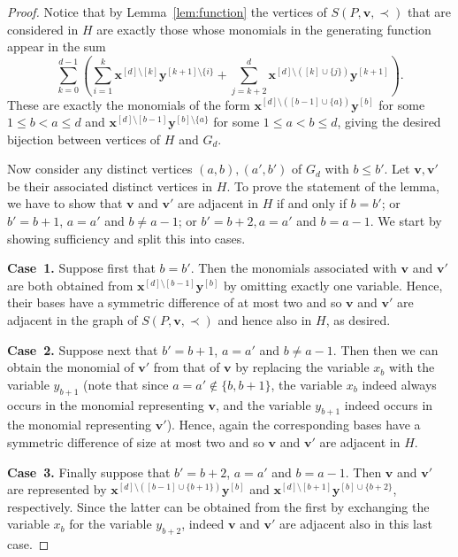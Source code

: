 \documentclass[centering,11pt,reqno]{amsart}
\theoremstyle{definition}
\begin{document}
\begin{proof}
Notice that by Lemma~\ref{lem:function} the vertices of $S(P,\mathbf{v},\prec)$ that are considered in $H$ are exactly those whose monomials in the generating function appear in the sum
\[\sum_{k=0}^{d-1} \left(\sum_{i=1}^{k} \mathbf{x}^{[d] \setminus [k]} \mathbf{y}^{[k+1] \setminus \{i\}} + \sum_{j=k+2}^{d} \mathbf{x}^{[d] \setminus ([k] \cup \{j\})} \mathbf{y}^{[k+1]} \right).\]
These are exactly the monomials of the form
$\mathbf{x}^{[d]\setminus ([b-1] \cup \{a\})}\mathbf{y}^{[b]}$ for some $1\le b<a\le d$ and $\mathbf{x}^{[d]\setminus [b-1]}\mathbf{y}^{[b]\setminus \{a\}}$ for some $1\le a<b\le d$, giving the desired bijection between vertices of $H$ and $G_d$. 

Now consider any distinct vertices $(a,b), (a',b')$ of $G_d$ with $b\le b'$. Let $\mathbf{v}, \mathbf{v'}$ be their associated distinct vertices in $H$. To prove the statement of the lemma, we have to show that $\mathbf{v}$ and $\mathbf{v}'$ are adjacent in $H$ if and only if $b=b'$; or $b'=b+1$, $a=a'$ and $b\neq a-1$; or $b'=b+2, a=a'$ and $b=a-1$. We start by showing sufficiency and split this into cases.

\textbf{Case~1.} Suppose first that $b=b'$. Then the monomials associated with $\mathbf{v}$ and $\mathbf{v}'$ are both obtained from $\mathbf{x}^{[d]\setminus [b-1]}\mathbf{y}^{[b]}$ by omitting exactly one variable. Hence, their bases have a symmetric difference of at most two and so $\mathbf{v}$ and $\mathbf{v}'$ are adjacent in the graph of $S(P,\mathbf{v},\prec)$ and hence also in $H$, as desired.

\textbf{Case~2.} Suppose next that $b'=b+1$, $a=a'$ and $b\neq a-1$. Then then we can obtain the monomial of $\mathbf{v}'$ from that of $\mathbf{v}$ by replacing the variable $x_{b}$ with the variable $y_{b+1}$ (note that since $a=a'\notin \{b,b+1\}$, the variable $x_{b}$ indeed always occurs in the monomial representing $\mathbf{v}$, and the variable $y_{b+1}$ indeed occurs in the monomial representing $\mathbf{v}'$). Hence, again the corresponding bases have a symmetric difference of size at most two and so $\mathbf{v}$ and $\mathbf{v}'$ are adjacent in $H$. 

\textbf{Case~3.} Finally suppose that $b'=b+2$, $a=a'$ and $b=a-1$. Then $\mathbf{v}$ and $\mathbf{v}'$ are represented by $\mathbf{x}^{[d]\setminus ([b-1]\cup \{b+1\})}\mathbf{y}^{[b]}$ and $\mathbf{x}^{[d]\setminus [b+1]}\mathbf{y}^{[b]\cup \{b+2\}}$, respectively. Since the latter can be obtained from the first by exchanging the variable $x_{b}$ for the variable $y_{b+2}$, indeed $\mathbf{v}$ and $\mathbf{v}'$ are adjacent also in this last case.


\end{proof}
\end{document}
